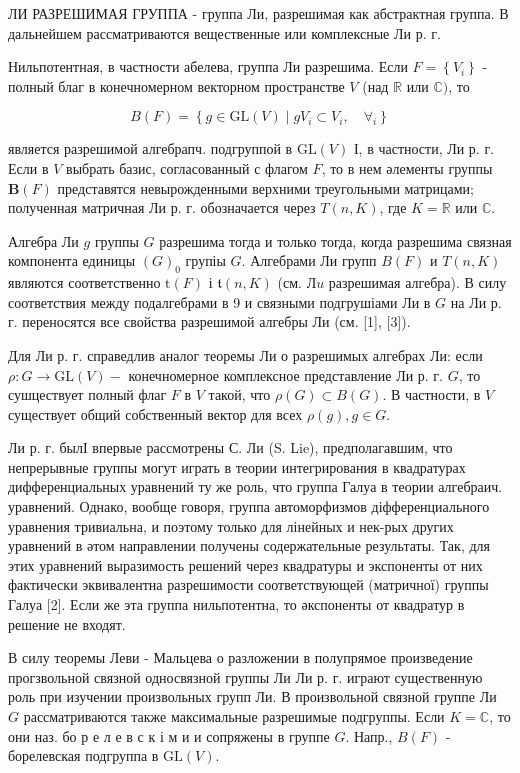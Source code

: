 \documentclass[10pt]{article}
\begin{document}
ЛИ РАЗРЕШИМАЯ ГРУППА - группа Ли, разрешимая как абстрактная группа. В дальнейшем рассматриваются вещественные или комплексные Ли р. г.



Нильпотентная, в частности абелева, группа Ли разрешима. Если $F=\left\{V_{i}\right\}$ - полный благ в конечномерном векторном пространстве $V$ (над $\mathbb{R}$ или $\mathbb{C})$, то



\[

B(F)=\left\{g \in \mathrm{GL}(V) \mid g V_{i} \subset V_{i}, \quad \forall_{i}\right\}

\]



является разрешимой алгебрапч. подгруппой в $\mathrm{GL}(V)$ І, в частности, Ли р. г. Если в $V$ выбрать базис, согласованный с флагом $F$, то в нем әлементы группы $\boldsymbol{B}(F)$ представятся невырожденными верхними треугольными матрицами; полученная матричная Ли р. г. обозначается через $T(n, K)$, где $K=\mathbb{R}$ или $\mathbb{C}$.



Алгебра Ли $g$ группы $G$ разрешима тогда и только тогда, когда разрешима связная компонента единицы $(G)_{0}$ групіы $G$. Алгебрами Ли групп $B(F)$ и $T(n, K)$ являются соответственно $\mathrm{t}(F)$ і $\mathfrak{t}(n, K)$ (см. $Л u$ разрешимая алгебра). В силу соответствия между подалгебрами в 9 и связными подгрушіами Ли в $G$ на Ли р. г. переносятся все свойства разрешимой алгебры Ли (см. [1], [3]).



Для Ли р. г. справедлив аналог теоремы Ли о разрешимых алгебрах Ли: если $\rho: G \rightarrow \mathrm{GL}(V)-$ конечномерное комплексное представление Ли р. г. $G$, то сушцествует полный флаг $F$ в $V$ такой, что $\rho(G) \subset B(G)$. В частности, в $V$ существует общий собственный вектор для всех $\rho(g), g \in G$.



Ли р. г. былІ впервые рассмотрены С. Ли (S. Lie), предполагавшим, что непрерывные группы могут играть в теории интегрирования в квадратурах дифференциальных уравнений ту же роль, что группа Галуа в теории алгебраич. уравнений. Однако, вообще говоря, группа автоморфизмов діфференциального уравнения тривиальна, и поэтому только для лінейных и нек-рых других уравнений в әтом направлении получены содержательные результаты. Так, для этих уравнений выразимость решений через квадратуры и экспоненты от них фактически эквивалентна разрешимости соответствующей (матричної) группы Галуа [2]. Если же эта группа нильпотентна, то әкспоненты от квадратур в решение не входят.



В силу теоремы Леви - Мальцева о разложении в полупрямое произведение прогзвольной связной односвязной группы Ли Ли р. г. играют существенную роль при изучении произвольных групп Ли. В произвольной связной группе Ли $G$ рассматриваются также максимальные разрешимые подгруппы. Если $K=\mathbb{C}$, то они наз. бо р е л е в с к і м и и сопряжены в группе $G$. Напр., $B(F)$ - борелевская подгруппа в $\mathrm{GL}(V)$.
\end{document}

